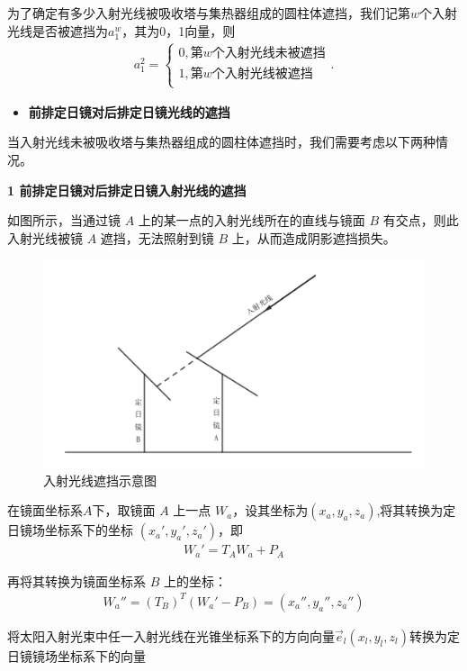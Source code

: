 \documentclass[../main.tex]{subfiles}
\begin{document}
\par 为了确定有多少入射光线被吸收塔与集热器组成的圆柱体遮挡，我们记第$w$个入射光线是否被遮挡为$a_1^w$，其为0，1向量，则
\begin{align}\label{1.28}
a_{1}^{2}=\begin{cases}
0,\text{第}w\text{个入射光线未被遮挡}\\
1,\text{第}w\text{个入射光线被遮挡}\\
\end{cases}.
\end{align}
\begin{itemize}
  \item \textbf{前排定日镜对后排定日镜光线的遮挡}
\end{itemize}
\par 当入射光线未被吸收塔与集热器组成的圆柱体遮挡时，我们需要考虑以下两种情况。
\par \textbf{1 前排定日镜对后排定日镜入射光线的遮挡}
\par 如图所示，当通过镜 \( A \) 上的某一点的入射光线所在的直线与镜面 \( B \) 有交点，则此入射光线被镜 \( A \) 遮挡，无法照射到镜 \( B \) 上，从而造成阴影遮挡损失。
\begin{figure}[H]
\centering
\includegraphics[width=.9\textwidth]{7}
\caption{入射光线遮挡示意图}
\label{1.29}
\end{figure}
\par 在镜面坐标系$A$下，取镜面 \( A \) 上一点 \( W_a\)，设其坐标为$(x_a,y_a,z_a)$,将其转换为定日镜场坐标系下的坐标 \( (x_a', y_a', z_a') \)，即
\begin{align}\label{1.30}
  W_a' = T_A W_a + P_A
\end{align}
\par 再将其转换为镜面坐标系 \( B \) 上的坐标：
\begin{align}\label{1.31}
 W_a'' = (T_B)^T (W_a' - P_B)=(x_a'', y_a'', z_a'')
\end{align}
\par 将太阳入射光束中任一入射光线在光锥坐标系下的方向向量$\vec{e}_l(x_l, y_l, z_l)$转换为定日镜镜场坐标系下的向量
\end{document}
